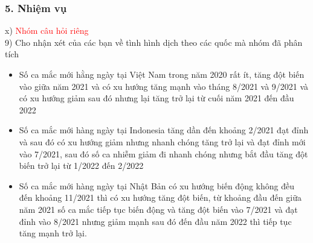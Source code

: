 \documentclass[english,10pt,table]{beamer}
\begin{document}
\begin{frame}[fragile]
\frametitle{5.  Nhiệm vụ}
x) \textcolor{red}{Nhóm câu hỏi riêng}\\
        9) Cho nhận xét của các bạn về tình hình dịch theo các quốc mà nhóm đã phân tích
        \begin{itemize}
        \item Số ca mắc mới hằng ngày tại Việt Nam trong năm 2020 rất ít, tăng đột biến vào giữa năm 2021 và có xu hướng tăng mạnh vào tháng 8/2021 và 9/2021 và có xu hướng giảm sau đó nhưng lại tăng trở lại từ cuối năm 2021 đến đầu 2022
        \item Số ca mắc mới hàng ngày tại Indonesia tăng dần đến khoảng 2/2021 đạt đỉnh và sau đó có xu hướng giảm nhưng nhanh chóng tăng trở lại và đạt đỉnh mới vào 7/2021, sau đó số ca nhiễm giảm đi nhanh chóng nhưng bắt đầu tăng đột biến trở lại từ 1/2022 đến 2/2022
        \item Số ca mắc mới hàng ngày tại Nhật Bản có xu hướng biến động không đều đến khoảng 11/2021 thì có xu hướng tăng đột biến, từ khoảng đầu đến giữa năm 2021 số ca mắc tiếp tục biến động và tăng đột biến vào 7/2021 và đạt đỉnh vào 8/2021 nhưng giảm mạnh sau đó đến đầu năm 2022 thì tiếp tục tăng mạnh trở lại.
        \end{itemize}
\end{frame}
\end{document}
